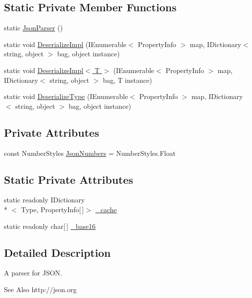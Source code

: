 \subsection*{Static Private Member Functions}
\begin{DoxyCompactItemize}
\item 
static \hyperlink{a00046_a1544c040c7ea06b664fdc4860a2f9bf8}{Json\-Parser} ()
\item 
static void \hyperlink{a00046_a67dcda2f39de7721d92a69dc4191f664}{Deserialize\-Impl} (I\-Enumerable$<$ Property\-Info $>$ map, I\-Dictionary$<$ string, object $>$ bag, object instance)
\item 
static void \hyperlink{a00046_a2630a01783ba0cda2e4e29c922951a66}{Deserialize\-Impl$<$ T $>$} (I\-Enumerable$<$ Property\-Info $>$ map, I\-Dictionary$<$ string, object $>$ bag, T instance)
\item 
static void \hyperlink{a00046_a551f727b71d49c59cd7a101790764e5b}{Deserialize\-Type} (I\-Enumerable$<$ Property\-Info $>$ map, I\-Dictionary$<$ string, object $>$ bag, object instance)
\end{DoxyCompactItemize}
\subsection*{Private Attributes}
\begin{DoxyCompactItemize}
\item 
const Number\-Styles \hyperlink{a00046_ad05db33540abe9864b13b6b5c637a354}{Json\-Numbers} = Number\-Styles.\-Float
\end{DoxyCompactItemize}
\subsection*{Static Private Attributes}
\begin{DoxyCompactItemize}
\item 
static readonly I\-Dictionary\\*
$<$ Type, Property\-Info\mbox{[}$\,$\mbox{]}$>$ \hyperlink{a00046_ae6f928a5caa81742eb3bac3e986f92f6}{\-\_\-cache}
\item 
static readonly char\mbox{[}$\,$\mbox{]} \hyperlink{a00046_a9d97f297996ac634f58dd842ebc00171}{\-\_\-base16}
\end{DoxyCompactItemize}


\subsection{Detailed Description}
A parser for J\-S\-O\-N. \begin{DoxySeeAlso}{See Also}
http\-://json.\-org


\end{DoxySeeAlso}




